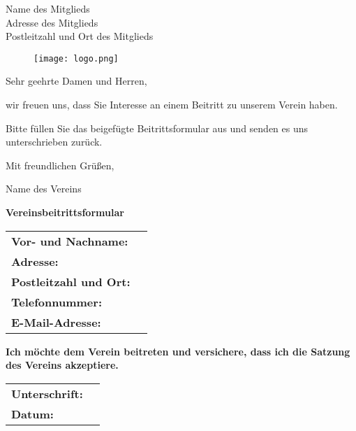 \documentclass[a4paper]{scrlttr2}
\begin{document}

\begin{letter}{%
Name des Mitglieds\\
Adresse des Mitglieds\\
Postleitzahl und Ort des Mitglieds
}


\begin{figure}[b]
\texttt{[image: logo.png]}
\end{figure}

\opening{Sehr geehrte Damen und Herren,}

wir freuen uns, dass Sie Interesse an einem Beitritt zu unserem Verein haben. 

Bitte füllen Sie das beigefügte Beitrittsformular aus und senden es uns unterschrieben zurück.

Mit freundlichen Grüßen,

\closing{Name des Vereins}

\end{letter}

\begin{center}
\Large\textbf{Vereinsbeitrittsformular}
\end{center}

\begin{tabular}{p{4.5cm} p{11cm}}
\textbf{Vor- und Nachname:} & \\
\textbf{Adresse:} & \\
\textbf{Postleitzahl und Ort:} & \\
\textbf{Telefonnummer:} & \\
\textbf{E-Mail-Adresse:} & \\
\end{tabular}

\begin{center}
\textbf{Ich möchte dem Verein beitreten und versichere, dass ich die Satzung des Vereins akzeptiere.}
\end{center}

\begin{tabular}{p{4.5cm} p{11cm}}
\textbf{Unterschrift:} & \\
\textbf{Datum:} & \\
\end{tabular}
\end{document}
